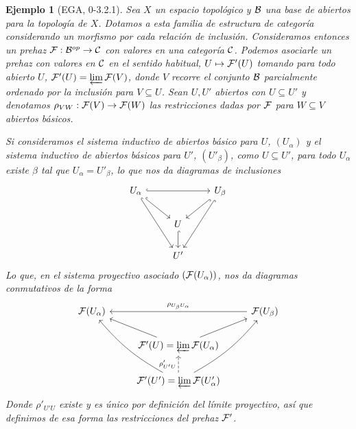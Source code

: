\documentclass[twoside]{article}
\newtheorem{eje}[defin]{Ejemplo}
\begin{document}
\begin{eje}[EGA, 0-3.2.1]\label{prehaztop}%
Sea $X$ un espacio topológico y ${\mathcal B}$ una base de abiertos para la topología de $X$. Dotamos a esta familia de estructura de categoría considerando un morfismo por cada relación de inclusión. Consideramos entonces un prehaz $\mathcal{F}:{\mathcal B}^{op}\to{\mathcal C}$ con valores en una categoría ${\mathcal C}$. Podemos asociarle un prehaz con valores en ${\mathcal C}$ en el sentido habitual, $U\mapsto \mathcal{F}'(U)$ tomando para todo abierto $U$, $\mathcal{F}'(U)=\varprojlim\mathcal{F}(V)$, donde $V$ recorre el conjunto ${\mathcal B}$ parcialmente ordenado por la inclusión para $V\subseteq U$. Sean $U,U'$ abiertos con $U\subseteq U'$ y denotamos $\rho_{VW}:\mathcal{F}(V)\to\mathcal{F}(W)$ las restricciones dadas por $\mathcal{F}$ para $W\subseteq V$ abiertos básicos.

Si consideramos el sistema inductivo de abiertos básico para $U$, $(U_\alpha)$ y el sistema inductivo de abiertos básicos para $U'$, $(U'_\beta)$, como $U\subseteq U'$, para todo $U_\alpha$ existe $\beta$ tal que $U_\alpha=U'_\beta$, lo que nos da diagramas de inclusiones
\[
\begin{tikzcd}
U_\alpha\arrow[rr, hookrightarrow]\arrow[ddr, hookrightarrow]\arrow[dr, hookrightarrow]& & U_\beta\arrow[dl, hookrightarrow]\arrow[ddl,hookrightarrow]\\
& U\arrow[d, hookrightarrow]& \\
& U' &
\end{tikzcd}
\]
Lo que, en el sistema proyectivo asociado $(\mathcal{F}(U_\alpha))$, nos da diagramas conmutativos de la forma
\[
\begin{tikzcd}
\calF(U_\alpha)& & \calF(U_\beta)\arrow[ll, "\rho_{U_\beta U_\alpha}"']\\
& \calF'(U)=\varprojlim\calF(U_\alpha)\arrow[ur]\arrow[ul]& \\
& \calF'(U')=\varprojlim\calF(U'_\alpha)\arrow[u, dashed, "\rho'_{U'U}"]\arrow[uul,bend left=10] \arrow[uur,bend right=10]&
\end{tikzcd}
\]
Donde $\rho'_{U'U}$ existe y es único por definición del límite proyectivo, así que definimos de esa forma las restricciones del prehaz $\mathcal{F}'$.%

\end{eje}
\end{document}
